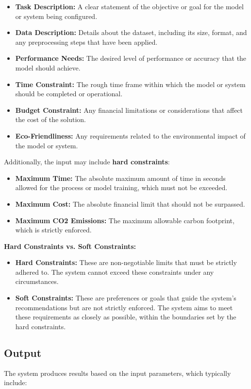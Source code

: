 \documentclass{report}
\begin{document}
\begin{itemize}
    \item \textbf{Task Description:} A clear statement of the objective or goal for the model or system being configured.
    \item \textbf{Data Description:} Details about the dataset, including its size, format, and any preprocessing steps that have been applied.
    \item \textbf{Performance Needs:} The desired level of performance or accuracy that the model should achieve.
    \item \textbf{Time Constraint:} The rough time frame within which the model or system should be completed or operational.
    \item \textbf{Budget Constraint:} Any financial limitations or considerations that affect the cost of the solution.
    \item \textbf{Eco-Friendliness:} Any requirements related to the environmental impact of the model or system.
\end{itemize}

Additionally, the input may include \textbf{hard constraints}:
\begin{itemize}
    \item \textbf{Maximum Time:} The absolute maximum amount of time in seconds allowed for the process or model training, which must not be exceeded.
    \item \textbf{Maximum Cost:} The absolute financial limit that should not be surpassed.
    \item \textbf{Maximum CO2 Emissions:} The maximum allowable carbon footprint, which is strictly enforced.
\end{itemize}

\textbf{Hard Constraints vs. Soft Constraints:}
\begin{itemize}
    \item \textbf{Hard Constraints:} These are non-negotiable limits that must be strictly adhered to. The system cannot exceed these constraints under any circumstances.
    \item \textbf{Soft Constraints:} These are preferences or goals that guide the system’s recommendations but are not strictly enforced. The system aims to meet these requirements as closely as possible, within the boundaries set by the hard constraints.
\end{itemize}


\subsection{Output}
The system produces results based on the input parameters, which typically include:
\end{document}
